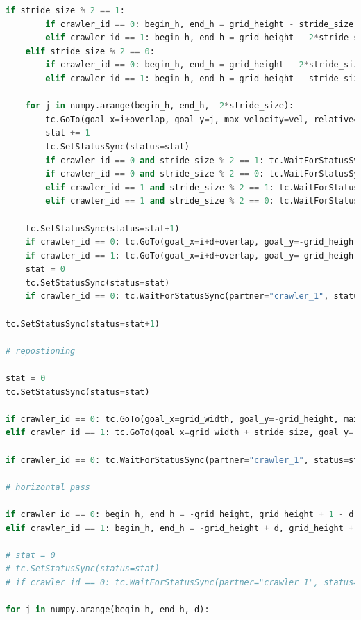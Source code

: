 \documentclass[francais,RandD]{rapportPFE}
\begin{document}
\begin{lstlisting}[language=Python,caption={Implémentation de l'algorithme de ski nordique},label=lst:ski_nordique]
	if stride_size % 2 == 1:
		if crawler_id == 0: begin_h, end_h = grid_height - stride_size, -grid_height - 1 - stride_size
		elif crawler_id == 1: begin_h, end_h = grid_height - 2*stride_size, -grid_height - 1 - stride_size
	elif stride_size % 2 == 0:
		if crawler_id == 0: begin_h, end_h = grid_height - 2*stride_size, -grid_height - 1 - stride_size
		elif crawler_id == 1: begin_h, end_h = grid_height - stride_size, -grid_height - 1 - stride_size

	for j in numpy.arange(begin_h, end_h, -2*stride_size):
		tc.GoTo(goal_x=i+overlap, goal_y=j, max_velocity=vel, relative=False)
		stat += 1
		tc.SetStatusSync(status=stat)
		if crawler_id == 0 and stride_size % 2 == 1: tc.WaitForStatusSync(partner="crawler_1", status=stat)
		if crawler_id == 0 and stride_size % 2 == 0: tc.WaitForStatusSync(partner="crawler_1", status=stat+1)
		elif crawler_id == 1 and stride_size % 2 == 1: tc.WaitForStatusSync(partner="crawler_0", status=stat+1)
		elif crawler_id == 1 and stride_size % 2 == 0: tc.WaitForStatusSync(partner="crawler_0", status=stat)

	tc.SetStatusSync(status=stat+1)
	if crawler_id == 0: tc.GoTo(goal_x=i+d+overlap, goal_y=-grid_height, max_velocity=vel, relative=False)
	if crawler_id == 1: tc.GoTo(goal_x=i+d+overlap, goal_y=-grid_height - stride_size, max_velocity=vel, relative=False)
	stat = 0
	tc.SetStatusSync(status=stat)
	if crawler_id == 0: tc.WaitForStatusSync(partner="crawler_1", status=stat+1)

tc.SetStatusSync(status=stat+1)

# repostioning

stat = 0
tc.SetStatusSync(status=stat)

if crawler_id == 0: tc.GoTo(goal_x=grid_width, goal_y=-grid_height, max_velocity=vel, relative=False)
elif crawler_id == 1: tc.GoTo(goal_x=grid_width + stride_size, goal_y=-grid_height + d, max_velocity=vel, relative=False)

if crawler_id == 0: tc.WaitForStatusSync(partner="crawler_1", status=stat+1)

# horizontal pass

if crawler_id == 0: begin_h, end_h = -grid_height, grid_height + 1 - d
elif crawler_id == 1: begin_h, end_h = -grid_height + d, grid_height + 1

# stat = 0
# tc.SetStatusSync(status=stat)
# if crawler_id == 0: tc.WaitForStatusSync(partner="crawler_1", status=stat+1)

for j in numpy.arange(begin_h, end_h, d):


\end{lstlisting}
\end{document}
